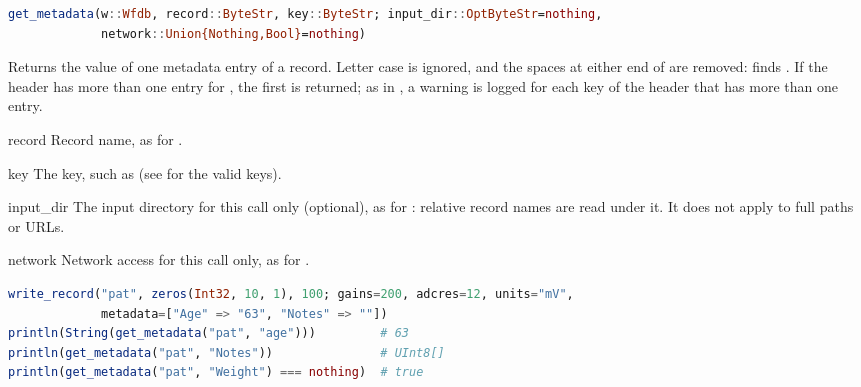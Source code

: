 \begin{lstlisting}[language=Julia,style=signature]
get_metadata(w::Wfdb, record::ByteStr, key::ByteStr; input_dir::OptByteStr=nothing,
             network::Union{Nothing,Bool}=nothing)
\end{lstlisting}
Returns the value of one metadata entry of a record. Letter case is ignored, and the
spaces at either end of  are removed:  finds . If the
header has more than one entry for , the first is returned; as in
, a warning is logged for each key of the header that has more than
one entry.
\begin{params}
\item[record] Record name, as for .
\item[key] The key, such as  (see  for the valid keys).
\item[input\_dir] The input directory for this call only (optional), as for
  : relative record names are read under it. It does not apply to full
  paths or URLs.
\item[network] Network access for this call only, as for .
\end{params}
\begin{lstlisting}[language=Julia,style=example]
write_record("pat", zeros(Int32, 10, 1), 100; gains=200, adcres=12, units="mV",
             metadata=["Age" => "63", "Notes" => ""])
println(String(get_metadata("pat", "age")))         # 63
println(get_metadata("pat", "Notes"))               # UInt8[]
println(get_metadata("pat", "Weight") === nothing)  # true
\end{lstlisting}


